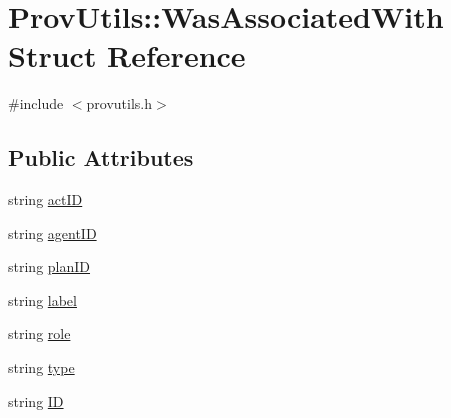 \hypertarget{struct_prov_utils_1_1_was_associated_with}{\section{Prov\-Utils\-:\-:Was\-Associated\-With Struct Reference}
\label{struct_prov_utils_1_1_was_associated_with}
}


{\ttfamily \#include $<$provutils.\-h$>$}

\subsection*{Public Attributes}
\begin{DoxyCompactItemize}
\item 
string \hyperlink{struct_prov_utils_1_1_was_associated_with_a005080cf31901af00296e6aabe8f8ceb}{act\-I\-D}
\item 
string \hyperlink{struct_prov_utils_1_1_was_associated_with_a355949a1838fdfcfbca42ba08d77f00f}{agent\-I\-D}
\item 
string \hyperlink{struct_prov_utils_1_1_was_associated_with_ac85ee54813b5a8b7d46dc4b017d278ab}{plan\-I\-D}
\item 
string \hyperlink{struct_prov_utils_1_1_was_associated_with_ae47f785d181230a52589c9e85aface02}{label}
\item 
string \hyperlink{struct_prov_utils_1_1_was_associated_with_abc52263ea80c3bff0c6a7f492a27a28b}{role}
\item 
string \hyperlink{struct_prov_utils_1_1_was_associated_with_a1af23db2361a85fe180b06f19a36a0d6}{type}
\item 
string \hyperlink{struct_prov_utils_1_1_was_associated_with_a9e2275a8b9b991b969acb43ec467eb85}{I\-D}
\end{DoxyCompactItemize}


